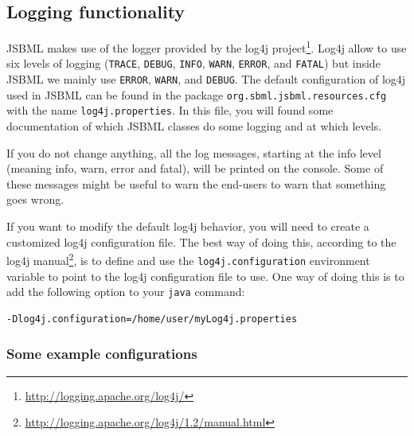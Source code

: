 \subsection{Logging functionality}
%

JSBML makes use of the logger provided by the log4j
project\footnote{\url{http://logging.apache.org/log4j/}}.
Log4j allow to use six levels
of logging (\texttt{TRACE}, \texttt{DEBUG},
\texttt{INFO}, \texttt{WARN}, \texttt{ERROR}, and \texttt{FATAL}) but inside
JSBML we mainly use \texttt{ERROR}, \texttt{WARN}, and \texttt{DEBUG}. The
default configuration of log4j used in JSBML can be found in the package
\texttt{org.sbml.jsbml.resources.cfg} with the name \texttt{log4j.properties}.
In this file, you will found some documentation of which JSBML classes do some 
logging and at which levels. 
 
If you do not change anything, all the log messages, starting at the info level 
(meaning info, warn, error and fatal), will be printed on the console.
Some of these messages might be useful to warn the end-users to warn that
something goes wrong.


If you want to modify the default log4j behavior, you will need to create a
customized log4j configuration file. The best way of doing this, according to
the log4j
manual\footnote{\url{http://logging.apache.org/log4j/1.2/manual.html}}, is to
define and use the \texttt{log4j.configuration} environment variable to point to
the log4j configuration file to use. One way of doing this is to add the
following option to your \texttt{java} command:
\begin{lstlisting}[language=bash,numbers=none,captionpos=t]
-Dlog4j.configuration=/home/user/myLog4j.properties
\end{lstlisting}

\subsubsection{Some example configurations}
%

